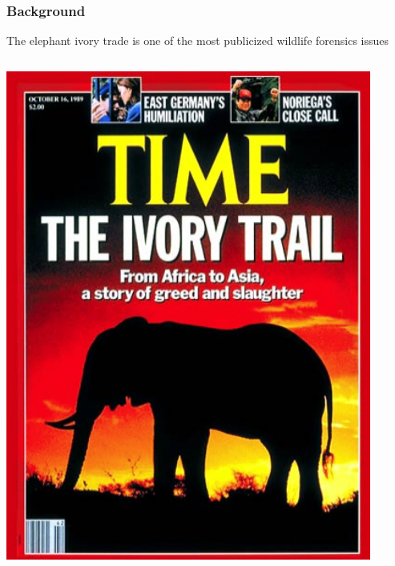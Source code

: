 \documentclass[10pt]{beamer}
\begin{document}
\begin{frame}[t]
\frametitle{Background}
\vspace{0.5cm}

	The elephant ivory trade is one of the most publicized wildlife forensics issues\\
	
	\vspace{0.5cm}
	
	\begin{columns}
		\begin{column}{0.33\textwidth}
			\begin{center}
				\includegraphics[width=0.9\textwidth]{figures/time.png}
			\end{center}
		\end{column}
		

\end{columns}
\end{frame}
\end{document}
